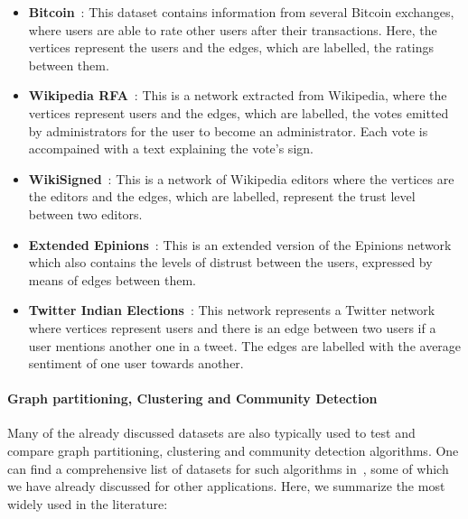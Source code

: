   \begin{itemize}
    \item \textbf{Bitcoin}~\cite{moore2013beware}: This dataset contains information from
      several Bitcoin exchanges, where users are able to rate other users after
      their transactions. Here, the vertices represent the users and the edges,
      which are labelled, the ratings between them.
    \item \textbf{Wikipedia RFA}~\cite{west2014exploiting}: This is a network extracted
      from Wikipedia, where the vertices represent users  and the
      edges, which are labelled, the votes emitted by administrators for the
      user to become an administrator.  Each vote is accompained with a text
      explaining the vote's sign.
    \item \textbf{WikiSigned}~\cite{maniu2011building}: This is a network of Wikipedia
      editors where the vertices are the editors and the edges, which are
      labelled, represent the trust level between two editors.
    \item \textbf{Extended Epinions}~\cite{massa2007trust}: This is an extended version of
      the Epinions network which also contains the levels of distrust between the
      users, expressed by means of edges between them.
    \item \textbf{Twitter Indian Elections}~\cite{kagan2015using}: This network represents
      a Twitter network where vertices represent users and there is an edge
      between two users if a user mentions another one in a tweet. The edges
      are labelled with the average sentiment of one user towards another.
  \end{itemize}


\paragraph{Graph partitioning, Clustering and Community Detection}

Many of the already discussed datasets are also typically used to test and
compare graph partitioning, clustering and community detection algorithms. One
can find a comprehensive list of datasets for such algorithms
in~\cite{10dimacs,yang2015defining}, some of which we have already discussed for other
applications. Here, we summarize the most widely used in the literature:

